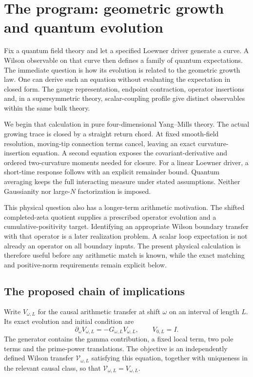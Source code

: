 \section{The program: geometric growth and quantum evolution}\label{sec:intro}

Fix a quantum field theory and let a specified Loewner driver generate
a curve. A Wilson observable on that curve then defines a family of
quantum expectations. The immediate question is how its evolution is
related to the geometric growth law. One can derive such an equation
without evaluating the expectation in closed form. The gauge
representation, endpoint contraction, operator insertions and, in a
supersymmetric theory, scalar-coupling profile give distinct observables
within the same bulk theory.

We begin that calculation in pure four-dimensional Yang--Mills theory.
The actual growing trace is closed by a straight return chord. At fixed
smooth-field resolution, moving-tip connection terms cancel, leaving
an exact curvature-insertion equation. A second equation exposes the
covariant-derivative and ordered two-curvature moments needed for
closure. For a linear Loewner driver, a short-time response follows
with an explicit remainder bound. Quantum averaging keeps the full
interacting measure under stated assumptions. Neither Gaussianity nor
large-$N$ factorization is imposed.

This physical question also has a longer-term arithmetic motivation.
The shifted completed-zeta quotient supplies a prescribed operator
evolution and a cumulative-positivity target. Identifying an appropriate
Wilson boundary transfer with that operator is a later realization
problem. A scalar loop expectation is not already an operator on all
boundary inputs. The present physical calculation is therefore useful
before any arithmetic match is known, while the exact matching and
positive-norm requirements remain explicit below.

\subsection{The proposed chain of implications}

Write $V_{\omega,L}$ for the causal arithmetic transfer at shift
$\omega$ on an interval of length $L$. Its exact evolution and initial
condition are
\[
 \partial_\omega V_{\omega,L}=-G_{\omega,L}V_{\omega,L},
 \qquad V_{0,L}=I.
\]
The generator contains the gamma contribution, a fixed local term,
two pole terms and the prime-power translations. The objective is an
independently defined Wilson transfer $\mathcal V_{\omega,L}$
satisfying this equation, together with uniqueness in the relevant
causal class, so that $\mathcal V_{\omega,L}=V_{\omega,L}$.

